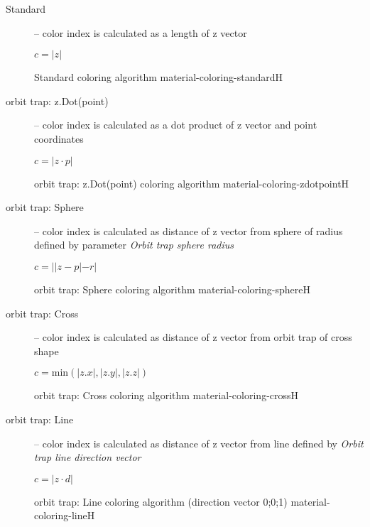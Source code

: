 \begin{description}
	\item[Standard] -- color index is calculated as a length of z vector
	\begin{center}
		\(c = |z|\)
	\end{center}
	{Standard coloring algorithm}
	{material-coloring-standard}{H}
	
	\item[orbit trap: z.Dot(point)] -- color index is calculated as a dot product of z vector and point coordinates
	\begin{center}
		\(c = |z \cdot p|\)
	\end{center}
	{orbit trap: z.Dot(point) coloring algorithm}
	{material-coloring-zdotpoint}{H}
	
	\pagebreak
	\item[orbit trap: Sphere] -- color index is calculated as distance of z vector from sphere of radius defined by parameter \emph{Orbit trap sphere radius}
	\begin{center}
		\(c = ||z - p|-r|\)
	\end{center}
	{orbit trap: Sphere coloring algorithm}
	{material-coloring-sphere}{H}
	
	\item[orbit trap: Cross] -- color index is calculated as distance of z vector from orbit trap of cross shape
	\begin{center}
		\(c = \mathrm{min}(|z.x|, |z.y|, |z.z|)\)
	\end{center}
	{orbit trap: Cross coloring algorithm}
	{material-coloring-cross}{H}
	
	\pagebreak
	\item[orbit trap: Line] -- color index is calculated as distance of z vector from line defined by \emph{Orbit trap line direction vector}
	\begin{center}
		\(c = |z \cdot d|\)
	\end{center}
	{orbit trap: Line coloring algorithm (direction vector 0;0;1)}
	{material-coloring-line}{H}
\end{description}

